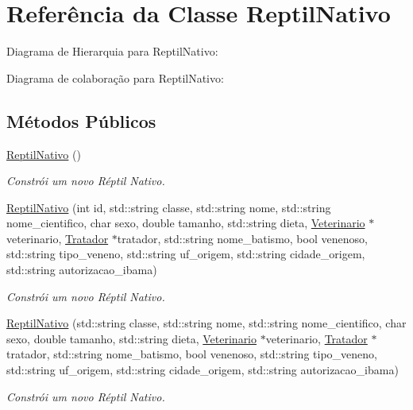 \hypertarget{classReptilNativo}{}\section{Referência da Classe Reptil\+Nativo}
\label{classReptilNativo}


Diagrama de Hierarquia para Reptil\+Nativo\+:


Diagrama de colaboração para Reptil\+Nativo\+:
\subsection*{Métodos Públicos}
\begin{DoxyCompactItemize}
\item 
\mbox{\label{classReptilNativo_a584bba0a356b2b3b961098541951fcbd}} 
\hyperlink{classReptilNativo_a584bba0a356b2b3b961098541951fcbd}{Reptil\+Nativo} ()
\begin{DoxyCompactList}\small\item\em Constrói um novo Réptil Nativo. \end{DoxyCompactList}\item 
\hyperlink{classReptilNativo_a1dcdc77205b5491129db3553bbf520fc}{Reptil\+Nativo} (int id, std\+::string classe, std\+::string nome, std\+::string nome\+\_\+cientifico, char sexo, double tamanho, std\+::string dieta, \hyperlink{classVeterinario}{Veterinario} $\ast$veterinario, \hyperlink{classTratador}{Tratador} $\ast$tratador, std\+::string nome\+\_\+batismo, bool venenoso, std\+::string tipo\+\_\+veneno, std\+::string uf\+\_\+origem, std\+::string cidade\+\_\+origem, std\+::string autorizacao\+\_\+ibama)
\begin{DoxyCompactList}\small\item\em Constrói um novo Réptil Nativo. \end{DoxyCompactList}\item 
\hyperlink{classReptilNativo_acd12c75a625763f1114d792991ccfa9b}{Reptil\+Nativo} (std\+::string classe, std\+::string nome, std\+::string nome\+\_\+cientifico, char sexo, double tamanho, std\+::string dieta, \hyperlink{classVeterinario}{Veterinario} $\ast$veterinario, \hyperlink{classTratador}{Tratador} $\ast$tratador, std\+::string nome\+\_\+batismo, bool venenoso, std\+::string tipo\+\_\+veneno, std\+::string uf\+\_\+origem, std\+::string cidade\+\_\+origem, std\+::string autorizacao\+\_\+ibama)
\begin{DoxyCompactList}\small\item\em Constrói um novo Réptil Nativo. \end{DoxyCompactList}\item 

\end{DoxyCompactItemize}
